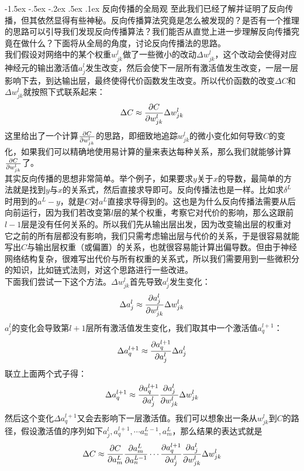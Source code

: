 \documentclass[a4paper, 11pt]{article}
\makeatletter
\newcommand{\sihao}{\fontsize{14pt}{\baselineskip}\selectfont}
\renewcommand\section{\@startsection{section}{1}{\z@}%
{-1.5ex \@plus -.5ex \@minus -.2ex}%
{.5ex \@plus .1ex}%
{\normalfont\sihao\CJKfamily{hei}}}
\makeatother
\begin{document}
\begin{CJK*}{GBK}{song}
\section{反向传播的全局观}
至此我们已经了解并证明了反向传播，但其依然显得有些神秘。反向传播算法究竟是怎么被发现的？是否有一个推理的思路可以引导我们发现反向传播算法？我们能否从直觉上进一步理解反向传播究竟在做什么？下面将从全局的角度，讨论反向传播法的思路。
\\ \indent
我们假设对网络中的某个权重$w_{jk}^l$做了一些微小的改动$\Delta w_{jk}^l$，这个改动会使得对应神经元的输出激活值$a_j^l$发生改变，然后会使下一层所有激活值发生改变，一层一层影响下去，到达输出层，最终使得代价函数发生改变。所以代价函数的改变$\Delta C$和$\Delta w_{jk}^l$就按照下式联系起来：
$$\Delta C \approx {{\partial C} \over {\partial w_{jk}^l}}\Delta w_{jk}^l$$
这里给出了一个计算${{\partial C} \over {\partial w_{jk}^l}}$的思路，即细致地追踪$w_{jk}^l$的微小变化如何导致$C$的变化，如果我们可以精确地使用易计算的量来表达每种关系，那么我们就能够计算${{\partial C} \over {\partial w_{jk}^l}}$了。
\\
\indent
其实反向传播的思想非常简单。举个例子，如果要求$y$关于$x$的导数，最简单的方法就是找到$y$与$x$的关系式，然后直接求导即可。反向传播法也是一样。比如求${\delta ^L}$时用到的$a^L-y$，就是$C$对$a^L$直接求导得到的。这也是为什么反向传播法需要从后向前运行，因为我们若改变第$l$层的某个权重，考察它对代价的影响，那么这跟前$l-1$层是没有任何关系的。所以我们先从输出层出发，因为改变输出层的权重对它之前的所有层都没有影响，我们只需考虑输出层与代价的关系，于是很容易就能写出$C$与输出层权重（或偏置）的关系，也就很容易能计算出偏导数。但由于神经网络结构复杂，很难写出代价与所有权重的关系式，所以我们需要用到一些微积分的知识，比如链式法则，对这个思路进行一些改进。
\\ \indent
下面我们尝试一下这个方法。$\Delta w_{jk}^l$首先导致$a_j^l$发生变化：
$$\Delta a_j^l \approx {{\partial a_j^l} \over {\partial w_{jk}^l}}\Delta w_{jk}^l$$
$a_j^l$的变化会导致第$l+1$层所有激活值发生变化，我们取其中一个激活值$a_q^{l + 1}$：
$$\Delta a_q^{l + 1} \approx {{\partial a_q^{l + 1}} \over {\partial a_j^l}}\Delta a_j^l$$
联立上面两个式子得：
$$\Delta a_q^{l + 1} \approx {{\partial a_q^{l + 1}} \over {\partial a_j^l}}{{\partial a_j^l} \over {\partial w_{jk}^l}}\Delta w_{jk}^l$$
然后这个变化$\Delta a_q^{l + 1}$又会去影响下一层激活值。我们可以想象出一条从${w_{jk}^l}$到$C$的路径，假设激活值的序列如下$a_j^l,a_q^{l + 1}, \cdots a_n^{L - 1},a_m^L$，那么结果的表达式就是
$$\Delta C \approx {{\partial C} \over {\partial a_m^L}}{{\partial a_m^L} \over {\partial a_n^{L - 1}}} \cdots {{\partial a_q^{l + 1}} \over {\partial a_j^l}}{{\partial a_j^l} \over {\partial w_{jk}^l}}\Delta w_{jk}^l$$

\end{CJK*}
\end{document}
